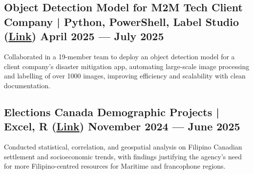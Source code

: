 

\subsection{{Object Detection Model for M2M Tech Client Company | Python, PowerShell, Label Studio (\href{https://github.com/Francis-Calingo/Proprietary-Data-Projects/tree/main?tab=readme-ov-file#object-detection-model-m2m-tech-client-company-april-2025---july-2025}{Link}) \hfill  April 2025 --- July 2025}}
Collaborated in a 19-member team to deploy an object detection model for a client company’s disaster mitigation app, automating large-scale image processing and labelling of over 1000 images, improving efficiency and scalability with clean documentation.

\vspace{5pt}

\subsection{{Elections Canada Demographic Projects | Excel, R (\href{https://github.com/Francis-Calingo/Elections-Canada-Demographic-Projects}{Link}) \hfill November 2024 --- June 2025}}
Conducted statistical, correlation, and geospatial analysis on Filipino Canadian settlement and socioeconomic trends,
with findings justifying the agency’s need for more Filipino-centred resources for Maritime and francophone regions.

\vspace{5pt}
